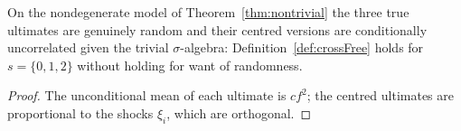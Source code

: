 \begin{theorem}\label{thm:crossFreeWitness}\leanok
{}
On the nondegenerate model of Theorem~\ref{thm:nontrivial} the three true ultimates are genuinely
random and their centred versions are conditionally uncorrelated given the trivial
$\sigma$-algebra: Definition~\ref{def:crossFree} holds for $s = \{0,1,2\}$ without holding for want
of randomness.
\end{theorem}
\begin{proof}\leanok
The unconditional mean of each ultimate is $c f^2$; the centred ultimates are proportional to the
shocks $\xi_i$, which are orthogonal.
\end{proof}
